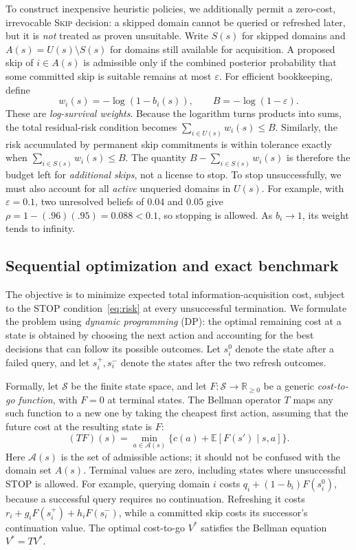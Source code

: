 \documentclass[conference]{IEEEtran}
\newcommand{\SKIP}{\textsc{Skip}}
\begin{document}
To construct inexpensive heuristic policies, we additionally permit a zero-cost, irrevocable \SKIP{} decision: a skipped domain cannot be queried or refreshed later, but it is \emph{not} treated as proven unsuitable. Write $S(s)$ for skipped domains and $A(s)=U(s)\setminus S(s)$ for domains still available for acquisition. A proposed skip of $i\in A(s)$ is admissible only if the combined posterior probability that some committed skip is suitable remains at most $\varepsilon$. For efficient bookkeeping, define
\begin{equation}
 w_i(s)=-\log(1-b_i(s)),\qquad B=-\log(1-\varepsilon).
 \label{eq:weights}
\end{equation}
These are \emph{log-survival weights}. Because the logarithm turns products into sums, the total residual-risk condition becomes $\sum_{i\in U(s)}w_i(s)\le B$. Similarly, the risk accumulated by permanent skip commitments is within tolerance exactly when $\sum_{i\in S(s)}w_i(s)\le B$. The quantity $B-\sum_{i\in S(s)}w_i(s)$ is therefore the budget left for \emph{additional skips}, not a license to stop. To stop unsuccessfully, we must also account for all \emph{active} unqueried domains in $U(s)$. For example, with $\varepsilon=0.1$, two unresolved beliefs of $0.04$ and $0.05$ give $\rho=1-(.96)(.95)=0.088<0.1$, so stopping is allowed. As $b_i\to1$, its weight tends to infinity.

\subsection{Sequential optimization and exact benchmark}
The objective is to minimize expected total information-acquisition cost, subject to the STOP condition~\eqref{eq:risk} at every unsuccessful termination. We formulate the problem using \emph{dynamic programming} (DP): the optimal remaining cost at a state is obtained by choosing the next action and accounting for the best decisions that can follow its possible outcomes. Let $s_i^0$ denote the state after a failed query, and let $s_i^+,s_i^-$ denote the states after the two refresh outcomes.

Formally, let $\mathcal S$ be the finite state space, and let $F:\mathcal S\to\mathbb R_{\ge0}$ be a generic \emph{cost-to-go function}, with $F=0$ at terminal states. The Bellman operator $T$ maps any such function to a new one by taking the cheapest first action, assuming that the future cost at the resulting state is $F$:
\begin{equation}
 (TF)(s)=\min_{a\in\mathcal A(s)}\{c(a)+\mathbb E[F(s')\mid s,a]\}.
 \label{eq:bellman}
\end{equation}
Here $\mathcal A(s)$ is the set of admissible actions; it should not be confused with the domain set $A(s)$. Terminal values are zero, including states where unsuccessful STOP is allowed. For example, querying domain $i$ costs $q_i+(1-b_i)F(s_i^0)$, because a successful query requires no continuation. Refreshing it costs $r_i+g_iF(s_i^+)+h_iF(s_i^-)$, while a committed skip costs its successor's continuation value. The optimal cost-to-go $V^*$ satisfies the Bellman equation $V^*=TV^*$.
\end{document}
